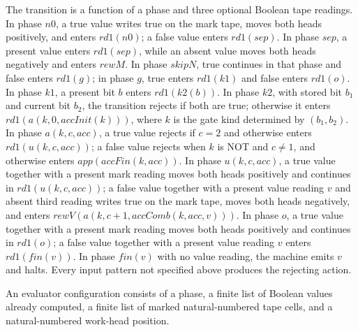 \begin{definition}
\label{BoolCircuit.CircuitEval.lact}
\leanok
{}
The transition is a function of a phase and three optional Boolean tape readings. In
phase $n0$, a true value writes true on the mark tape, moves both heads positively, and
enters $rd1(n0)$; a false value enters $rd1(sep)$. In phase $sep$, a present value
enters $rd1(sep)$, while an absent value moves both heads negatively and enters $rewM$.
In phase $skipN$, true continues in that phase and false enters $rd1(g)$; in phase $g$,
true enters $rd1(k1)$ and false enters $rd1(o)$. In phase $k1$, a present bit $b$ enters
$rd1(k2(b))$. In phase $k2$, with stored bit $b_1$ and current bit $b_2$, the transition
rejects if both are true; otherwise it enters $rd1(a(k,0,accInit(k)))$, where $k$ is the
gate kind determined by $(b_1,b_2)$. In phase $a(k,c,acc)$, a true value rejects if
$c=2$ and otherwise enters $rd1(u(k,c,acc))$; a false value rejects when $k$ is NOT and
$c\ne1$, and otherwise enters $app(accFin(k,acc))$. In phase $u(k,c,acc)$, a true value
together with a present mark reading moves both heads positively and continues in
$rd1(u(k,c,acc))$; a false value together with a present value reading $v$ and absent
third reading writes true on the mark tape, moves both heads negatively, and enters
$rewV(a(k,c+1,accComb(k,acc,v)))$. In phase $o$, a true value together with a present
mark reading moves both heads positively and continues in $rd1(o)$; a false value
together with a present value reading $v$ enters $rd1(fin(v))$. In phase $fin(v)$ with
no value reading, the machine emits $v$ and halts. Every input pattern not specified
above produces the rejecting action.
\end{definition}

\begin{definition}
\label{BoolCircuit.CircuitEval.AS}
\leanok
{}
An evaluator configuration consists of a phase, a finite list of Boolean values already
computed, a finite list of marked natural-numbered tape cells, and a natural-numbered
work-head position.
\end{definition}

